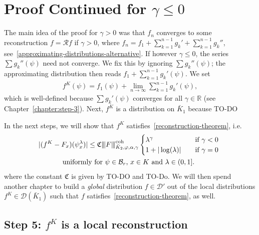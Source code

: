 


\chapter{Proof Continued for \texorpdfstring{\(\gamma \leq 0\)}{gamma <= 0}}\label{chapter:proof-gamma-negative}

The main idea of the proof for \(\gamma > 0\) was that \(f_n\) converges to some reconstruction \(f = \mathcal{R}f\) if \(\gamma > 0\), where \(f_n = f_1 + \sum\limits^{n-1}_{k=1} g_k'  + \sum\limits^{n-1}_{k=1} g_k''\), see~\eqref{approximating-distributions-alternative}.   
If however \(\gamma \leq 0\), the series \(\sum g_k''(\psi)\) need not converge. We fix this by ignoring \(\sum g_k''(\psi)\); the approximating distribution then reads \(f_1 + \sum\limits^{n-1}_{k=1} g_k'(\psi)\). We set 
\begin{align*}
    f^K(\psi) = f_1(\psi) + \lim_{n\to \infty}\sum^{n-1}_{k=1} g_k'(\psi),
\end{align*}
which is well-defined because \(\sum g_k'(\psi)\) converges for all \(\gamma \in \mathbb{R}\) (see Chapter~\ref{chapter:step-3}). Next, \(f^K\) is a distribution on \(\bar K_1\) because TO-DO

In the next steps, we will show that \(f^K\) satisfies~\eqref{reconstruction-theorem}, i.e.
\begin{gather*}
    |(f^K - F_x)(\psi_x^\lambda)| \leq \mathfrak{C} {\left\vert\kern-0.25ex\left\vert\kern-0.25ex\left\vert F \right\vert\kern-0.25ex\right\vert\kern-0.25ex\right\vert}^{\mathrm{coh}}_{\bar K_{2},\varphi,\alpha,\gamma} \begin{cases}
        \lambda^\gamma  &\text{if \(\gamma < 0\)}\\
        1 + |\log(\lambda)| \quad &\text{if \(\gamma = 0\) } 
    \end{cases}
    \\
    \text{uniformly for \(\psi \in \mathcal{B}_r\), \(x \in K\) and \(\lambda \in(0,1]\).   }
\end{gather*}
where the constant \(\mathfrak{C}\) is given by TO-DO and TO-Do. We will then spend another chapter to build a \emph{global} distribution \(f \in \mathcal{D}'\) out of the local distributions \(f^K \in \mathcal{D}(\bar K_1)\) such that \(f\) satisfies~\eqref{reconstruction-theorem}, as well.

\section{Step 5: \texorpdfstring{\(f^K\) is a local reconstruction}{fK is a local reconstruction}}
 
